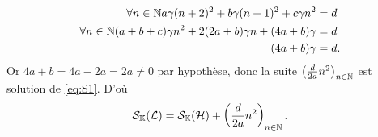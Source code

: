 \begin{itemize}
\begin{itemize}
    \begin{align}
      \forall n \in \mathbb{N} a\gamma(n+2)^2 +b\gamma(n+1)^2 +c\gamma n^2 &=d\\
      \forall n \in \mathbb{N} (a+b+c)\gamma n^2 +2(2a+b)\gamma n +(4a+b)\gamma &=d \\
      (4a+b)\gamma &=d.
    \end{align}
    Or \(4a+b=4a-2a=2a \neq 0\) par hypothèse, donc la suite \(\left(\frac{d}{2a} n^2\right)_{n \in \mathbb{N}}\) est solution de \eqref{eq:S1}. D'où
    \begin{equation}
      \mathcal{S}_{\mathbb{K}}(\mathcal{L}) = \mathcal{S}_{\mathbb{K}}(\mathcal{H}) + \left(\frac{d}{2a} n^2\right)_{n \in \mathbb{N}}.
    \end{equation}
  \end{itemize}
\end{itemize}
